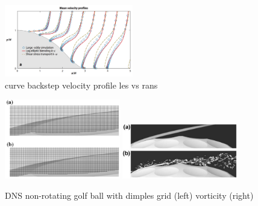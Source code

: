 \documentclass[journal]{new-aiaa}
\begin{document}


\begin{figure}[H]
\begin{center}
\includegraphics[width=0.5\textwidth]{Images/logan/durbin2018some_BackstepLESvsRANS.pdf}
\caption{curve backstep velocity profile les vs rans \cite{durbin2018some}}
\label{fig:lesvsransbackstep}
\end{center}
\end{figure}







\begin{figure}[H]
\begin{center}
\includegraphics[width=0.45\textwidth]{Images/logan/smith2010numerical_golfballgrid.pdf}
\includegraphics[width=0.45\textwidth]{Images/logan/smith2010numerical_golfballvorticity.pdf}
\caption{ DNS non-rotating golf ball with dimples grid (left) vorticity (right) \cite{smith2010numerical} }
\label{fig:dnsgolfball}
\end{center}
\end{figure}
\end{document}
